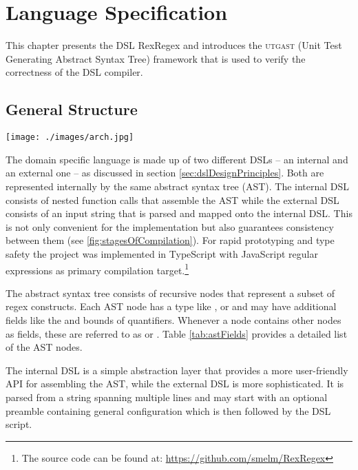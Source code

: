 \chapter{Language Specification}

This chapter presents the DSL RexRegex and introduces the \textsc{utgast} (Unit Test Generating Abstract Syntax Tree) framework that is used to verify the correctness of the DSL compiler.

\section{General Structure}

\begin{boxFigure}[title={Stages of Compilation},label=fig:stagesOfCompilation]
\texttt{[image: ./images/arch.jpg]}
\end{boxFigure}

The domain specific language is made up of two different DSLs -- an internal and an external one -- as discussed in section \ref{sec:dslDesignPrinciples}. Both are represented internally by the same abstract syntax tree (AST). The internal DSL consists of nested function calls that assemble the AST while the external DSL consists of an input string that is parsed and mapped onto the internal DSL. This is not only convenient for the implementation but also guarantees consistency between them (see \ref{fig:stagesOfCompilation}). For rapid prototyping and type safety the project was implemented in TypeScript with JavaScript regular expressions as primary compilation target.\footnote{The source code can be found at: \url{https://github.com/smelm/RexRegex}} 

The abstract syntax tree consists of recursive nodes that represent a subset of regex constructs. Each AST node has a type like ,  or  and may have additional fields like the  and  bounds of quantifiers. Whenever a node contains other nodes as fields, these are referred to as  or . Table \ref{tab:astFields} provides a detailed list of the AST nodes.

The internal DSL is a simple abstraction layer that provides a more user-friendly API for assembling the AST, while the external DSL is more sophisticated. It is parsed from a string spanning multiple lines and may start with an optional preamble containing general configuration which is then followed by the DSL script.

